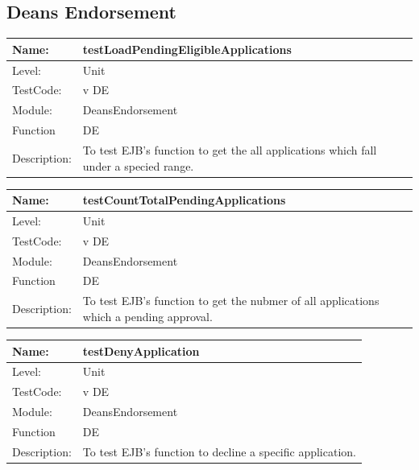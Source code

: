 \documentclass[12pt]{article}
\begin{document}
\begin{flushleft}
\subsection{Deans Endorsement}

\begin{center}
\begin{tabular}{|l|p{12cm}|}
\hline

 Name: & testLoadPendingEligibleApplications  \\
\hline
Level: & Unit \\
\hline
TestCode: & v DE \\
\hline
Module:& DeansEndorsement \\
\hline
Function & DE \\
\hline
Description: & To test EJB's function to get the all applications which fall under a specied range. \\
\hline
\end{tabular}
\end{center}

\begin{center}
\begin{tabular}{|l|p{12cm}|}
\hline

 Name: & testCountTotalPendingApplications  \\
\hline
Level: & Unit \\
\hline
TestCode: & v DE \\
\hline
Module:& DeansEndorsement \\
\hline
Function & DE \\
\hline
Description: & To test EJB's function to get the nubmer of all applications which a pending approval. \\
\hline
\end{tabular}
\end{center}

\begin{center}
\begin{tabular}{|l|p{12cm}|}
\hline

 Name: & testDenyApplication  \\
\hline
Level: & Unit \\
\hline
TestCode: & v DE \\
\hline
Module:& DeansEndorsement \\
\hline
Function & DE \\
\hline
Description: & To test EJB's function to decline a specific application. \\
\hline
\end{tabular}
\end{center}


\end{flushleft}
\end{document}
